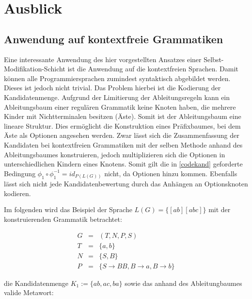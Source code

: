 \documentclass[a4paper,12pt]{report}
\begin{document}

\chapter{Ausblick}
\label{ausblick}




\section{Anwendung auf kontextfreie Grammatiken}

Eine interessante Anwendung des hier vorgestellten Ansatzes einer Selbst-Modifikation-Schicht ist die Anwendung auf die kontextfreien Sprachen. Damit können alle Programmiersprachen zumindest syntaktisch abgebildet werden. Dieses ist jedoch nicht trivial. Das Problem hierbei ist die Kodierung der Kandidatenmenge. Aufgrund der Limitierung der Ableitungsregeln kann ein Ableitungsbaum einer regulären Grammatik keine Knoten haben, die mehrere Kinder mit Nichtterminalen besitzen (Äste). Somit ist der Ableitungsbaum eine lineare Struktur. Dies ermöglicht die Konstruktion eines Präfixbaumes, bei dem Äste als Optionen angesehen werden. 
Zwar lässt sich die Zusammenfassung der Kandidaten bei kontextfreien Grammatiken mit der selben Methode anhand des Ableitungsbaumes konstruieren, jedoch multiplizieren sich die Optionen in unterschiedlichen Kindern eines Knotens. Somit gilt die in \ref{codekand} geforderte Bedingung $\phi_1\circ\phi_1^{-1} = id_{P(L(G))}$ nicht, da Optionen hinzu kommen. Ebenfalls lässt sich nicht jede Kandidatenbewertung durch das Anhängen an Optionsknoten kodieren.

Im folgenden wird das Beispiel der Sprache $L(G) = \{ [ab][abc] \}$ mit der konstruierenden Grammatik betrachtet: 

\begin{eqnarray}
  G &=& (T,N,P,S)\\
  T &=& \{ a, b \}\\
  N &=& \{ S, B \} \\
  P &=& \{ S\rightarrow BB, B\rightarrow a, B\rightarrow b\}
\end{eqnarray}

die Kandidatenmenge $K_1:=\{ab, ac, ba\}$ sowie das anhand des Ableitungbaumes valide Metawort: 
\end{document}
